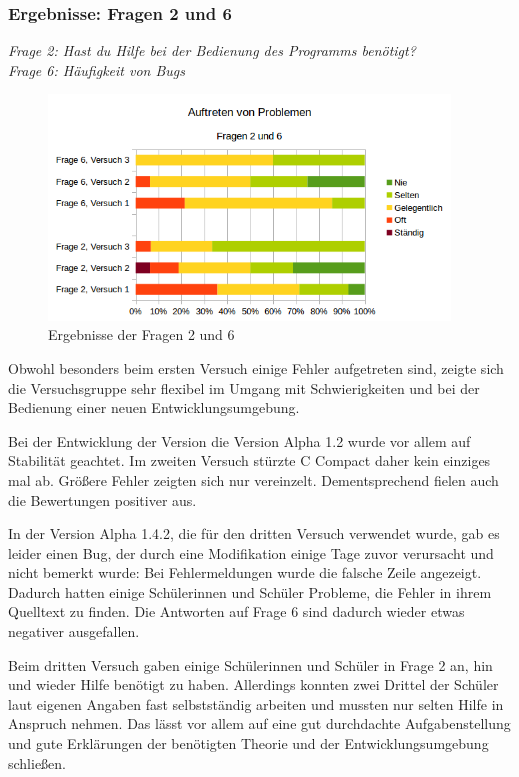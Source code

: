 \subsubsection*{Ergebnisse: Fragen 2 und 6}

\emph{Frage 2: Hast du Hilfe bei der Bedienung des Programms benötigt?\\
Frage 6: Häufigkeit von Bugs}

\begin{figure}[h!]
\centering
\includegraphics[width=0.95\textwidth]{./media/images/gui/trials/gui-f2-6.png}
\caption{Ergebnisse der Fragen 2 und 6}
\end{figure}

Obwohl besonders beim ersten Versuch einige Fehler aufgetreten sind, zeigte sich die Versuchsgruppe sehr flexibel im Umgang mit Schwierigkeiten und bei der Bedienung einer neuen Entwicklungsumgebung.

Bei der Entwicklung der Version die Version Alpha 1.2 wurde vor allem auf Stabilität geachtet. Im zweiten Versuch stürzte C Compact daher kein einziges mal ab. Größere Fehler zeigten sich nur vereinzelt. Dementsprechend fielen auch die Bewertungen positiver aus.

In der Version Alpha 1.4.2, die für den dritten Versuch verwendet wurde, gab es leider einen Bug, der durch eine Modifikation einige Tage zuvor verursacht und nicht bemerkt wurde: Bei Fehlermeldungen wurde die falsche Zeile angezeigt. Dadurch hatten einige Schülerinnen und Schüler Probleme, die Fehler in ihrem Quelltext zu finden. Die Antworten auf Frage 6 sind dadurch wieder etwas negativer ausgefallen.

Beim dritten Versuch gaben einige Schülerinnen und Schüler in Frage 2 an, hin und wieder Hilfe benötigt zu haben. Allerdings konnten zwei Drittel der Schüler laut eigenen Angaben fast selbstständig arbeiten und mussten nur selten Hilfe in Anspruch nehmen. Das lässt vor allem auf eine gut durchdachte Aufgabenstellung und gute Erklärungen der benötigten Theorie und der Entwicklungsumgebung schließen.

